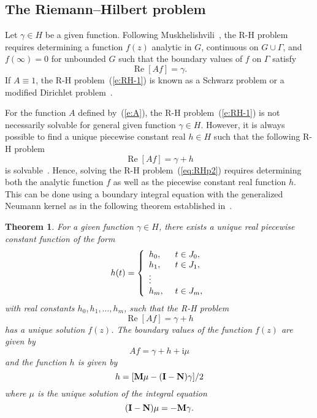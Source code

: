\documentclass[11pt,a4paper]{article}
\newtheorem{theorem}{Theorem}
\renewcommand{\Re}{\mathop{\mathrm{Re}}}
\renewcommand{\i}{\mathrm{i}}
\renewcommand{\Re}{\mathop{\mathrm{Re}}}
\renewcommand{\i}{\mathrm{i}}
\newcommand{\bM}{{\bf M}}
\newcommand{\bN}{{\bf N}}
\newcommand{\bI}{{\bf I}}
\begin{document}
\subsection{The Riemann--Hilbert problem }

Let $\gamma\in H$ be a given function. Following Muskhelishvili~\cite{Mus}, the R-H problem requires determining a function $f(z)$ analytic in $G$, continuous on $G\cup\Gamma$, and $f(\infty)=0$ for unbounded $G$ such that the boundary values of $f$ on $\Gamma$ satisfy
\begin{equation}\label{e:RH-1}
\Re[Af]=\gamma.
\end{equation}
If $A\equiv1$, the R-H problem~(\ref{e:RH-1}) is known as a Schwarz problem or a modified Dirichlet problem~\cite{Gak66,Mus}.

For the function $A$ defined by~(\ref{e:A}), the R-H problem~(\ref{e:RH-1}) is not necessarily solvable for general given function $\gamma\in H$. However, it is always possible to find a unique piecewise constant real $h\in H$ such that the following R-H problem 
\begin{equation}\label{eq:RHp2}
\Re [A f]=\gamma+h
\end{equation}
is solvable~\cite{Nas-CMFT09}. Hence, solving the R-H problem~(\ref{eq:RHp2}) requires determining both the analytic function $f$ as well as the piecewise constant real function $h$. This can be done using a boundary integral equation with the generalized Neumann kernel as in the following theorem established in~\cite{Nas-CMFT09}.

\begin{theorem}\label{thm:rhp}
For a given function $\gamma\in H$, there exists a unique real piecewise constant function of the form
\begin{equation}\label{e:piece}
h(t) = \left\{
\begin{array}{l@{\hspace{0.5cm}}l}
 h_{0},     &t\in J_{0}, \\
 h_{1},     &t\in J_{1}, \\
 \vdots   & \\
 h_m,     &t\in J_m, \\
\end{array}%
\right.
\end{equation}
with real constants $h_{0},h_{1},\ldots,h_m$, such that the R-H problem 
\begin{equation}\label{e:RH-p}
\Re[Af]=\gamma+h
\end{equation}
has a unique solution $f(z)$. The boundary values of the function $f(z)$ are given by 
\begin{equation}\label{e:Af}
Af=\gamma+h+\i\mu
\end{equation}
and the function $h$ is given by
\begin{equation}\label{e:h}
h=[\bM\mu-(\bI-\bN)\gamma]/2
\end{equation}
where $\mu$ is the unique solution of the integral equation
\begin{equation}\label{e:ie}
(\bI-\bN)\mu=-\bM\gamma.
\end{equation}
\end{theorem}
\end{document}
